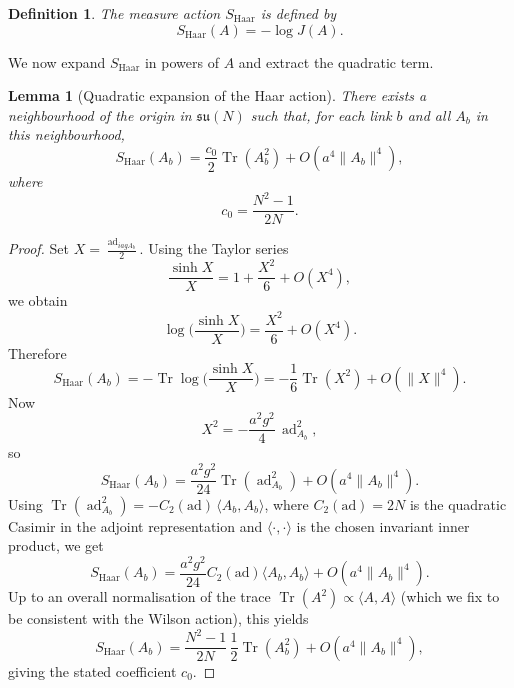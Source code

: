 \documentclass[11pt]{article}
\newtheorem{lemma}[theorem]{Lemma}
\newtheorem{definition}[theorem]{Definition}
\begin{document}
\begin{definition}
The \emph{measure action} $S_{\mathrm{Haar}}$ is defined by
\begin{equation}
  S_{\mathrm{Haar}}(A) = -\log J(A).
\end{equation}
\end{definition}

We now expand $S_{\mathrm{Haar}}$ in powers of $A$ and extract the
quadratic term.

\begin{lemma}[Quadratic expansion of the Haar action]
\label{lem:Haar-quadratic}
There exists a neighbourhood of the origin in $\mathfrak{su}(N)$ such
that, for each link $b$ and all $A_b$ in this neighbourhood,
\begin{equation}
  S_{\mathrm{Haar}}(A_b)
  = \frac{c_0}{2}\operatorname{Tr}(A_b^2)
    + O(a^4\|A_b\|^4),
\end{equation}
where
\begin{equation}
  c_0 = \frac{N^2-1}{2N}.
\end{equation}
\end{lemma}

\begin{proof}
Set $X = \tfrac{\operatorname{ad}_{iagA_b}}{2}$.  Using the Taylor
series
\[
  \frac{\sinh X}{X} = 1 + \frac{X^2}{6} + O(X^4),
\]
we obtain
\[
  \log\Big(\frac{\sinh X}{X}\Big)
  = \frac{X^2}{6} + O(X^4).
\]
Therefore
\begin{equation}
  S_{\mathrm{Haar}}(A_b)
  = -\operatorname{Tr}\log\Big(\frac{\sinh X}{X}\Big)
  = -\frac{1}{6}\operatorname{Tr}(X^2) + O(\|X\|^4).
\end{equation}
Now
\[
  X^2 = -\frac{a^2g^2}{4}\,\operatorname{ad}_{A_b}^2,
\]
so
\begin{equation}
  S_{\mathrm{Haar}}(A_b)
  = \frac{a^2g^2}{24}\operatorname{Tr}(\operatorname{ad}_{A_b}^2)
    + O(a^4\|A_b\|^4).
\end{equation}
Using $\operatorname{Tr}(\operatorname{ad}_{A_b}^2)
= -C_2(\mathrm{ad})\,\langle A_b,A_b\rangle$, where
$C_2(\mathrm{ad})=2N$ is the quadratic Casimir in the adjoint
representation and $\langle\cdot,\cdot\rangle$ is the chosen invariant
inner product, we get
\begin{equation}
  S_{\mathrm{Haar}}(A_b)
  = \frac{a^2g^2}{24}C_2(\mathrm{ad})\langle A_b,A_b\rangle
    + O(a^4\|A_b\|^4).
\end{equation}
Up to an overall normalisation of the trace
$\operatorname{Tr}(A^2)\propto\langle A,A\rangle$ (which we fix to be
consistent with the Wilson action), this yields
\begin{equation}
  S_{\mathrm{Haar}}(A_b)
  = \frac{N^2-1}{2N}\,\frac{1}{2}\operatorname{Tr}(A_b^2)
    + O(a^4\|A_b\|^4),
\end{equation}
giving the stated coefficient $c_0$.
\end{proof}
\end{document}
